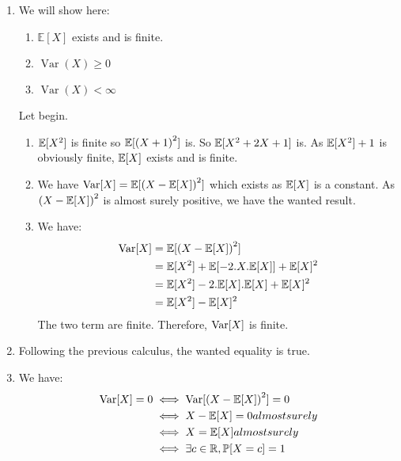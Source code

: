 \begin{solution}
  \begin{enumerate}
    \item We will show here:
          \begin{enumerate}
            \item $\mathbb{E}[X]$ exists and is finite.
            \item $\operatorname{Var}(X) \geq 0$
            \item $\operatorname{Var}(X) < \infty$
          \end{enumerate}
          Let begin.
          \begin{enumerate}
            \item $\mathbb{E}[X^2]$ is finite so $\mathbb{E}[{(X+1)}^2]$ is. So $\mathbb{E}[X^2 + 2X + 1]$ is.
                  As $\mathbb{E}[X^2] +1$ is obviously finite, $\mathbb{E}[X]$ exists and is finite.
            \item We have $\operatorname{Var}[X] = \mathbb{E}[{(X-\mathbb{E}[X])}^2]$ which exists as
                  $\mathbb{E}[X]$ is a constant. As ${(X-\mathbb{E}[X])}^2$ is almost surely
                  positive, we have the wanted result.
            \item We have:
                  \begin{align*}
                    \operatorname{Var}[X] & = \mathbb{E}[{(X-\mathbb{E}[X])}^2]                                   \\
                            & = \mathbb{E}[X^2] + \mathbb{E}[- 2.X.\mathbb{E}[X]] + \mathbb{E}[X]^2 \\
                            & = \mathbb{E}[X^2] - 2.\mathbb{E}[X].\mathbb{E}[X] + \mathbb{E}[X]^2   \\
                            & = \mathbb{E}[X^2] - \mathbb{E}[X]^2
                  \end{align*}
                  The two term are finite. Therefore, $\operatorname{Var}[X]$ is finite.
          \end{enumerate}
    \item Following the previous calculus, the wanted equality is true.
    \item We have:
          \begin{align*}
            \operatorname{Var}[X] = 0 & \iff \operatorname{Var}[{(X-\mathbb{E}[X])}^2] = 0             \\
                        & \iff X - \mathbb{E}[X] = 0 almost surely         \\
                        & \iff X = \mathbb{E}[X] almost surely             \\
                        & \iff \exists c \in \mathbb{R}, \mathbb{P}[X = c] = 1
          \end{align*}


\end{enumerate}
\end{solution}
